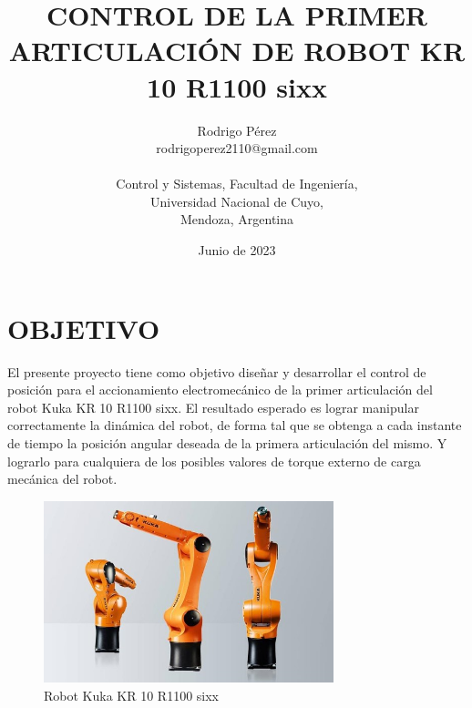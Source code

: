 \documentclass{article}
\title{CONTROL DE LA PRIMER ARTICULACIÓN
DE ROBOT KR 10 R1100 sixx}
\author{Rodrigo Pérez \\ rodrigoperez2110@gmail.com \\ \\ Control y Sistemas, Facultad de Ingeniería, \\ Universidad Nacional de Cuyo, \\ Mendoza, Argentina}
\date{Junio de 2023}
\begin{document}
\renewcommand{\tablename}{Tabla}

\maketitle


\section{OBJETIVO}
\label{sec:intro}


El presente proyecto tiene como objetivo diseñar y desarrollar el control de posición para el accionamiento electromecánico de la primer articulación del robot Kuka KR 10 R1100 sixx. El resultado esperado es lograr manipular correctamente la dinámica del robot, de forma tal que se obtenga a cada instante de tiempo la posición angular deseada de la primera articulación del mismo. Y lograrlo para cualquiera de los posibles valores de torque externo de carga mecánica del robot.


\begin{figure}[H]
    \centering
    \includegraphics[width=0.75\textwidth]{3RobotsKuka}
    \caption{Robot Kuka KR 10 R1100 sixx}
    \label{fig:3RobotsKuka}
\end{figure}
\end{document}
